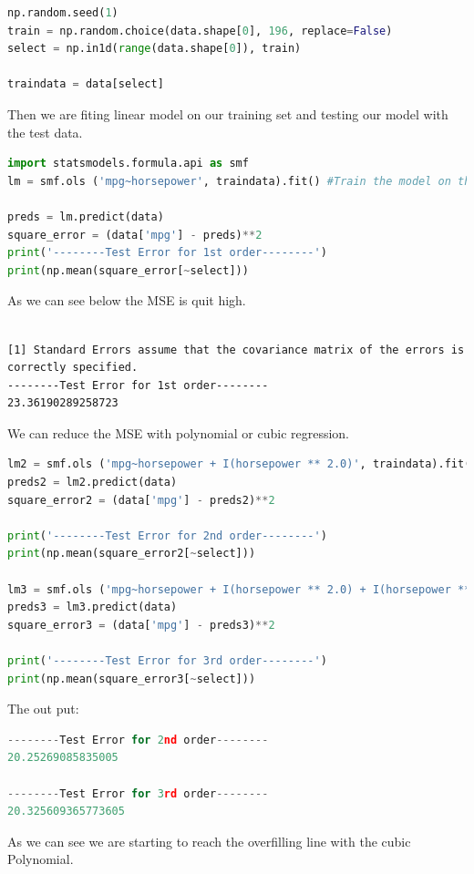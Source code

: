 \begin{lstlisting}[language=Python]
np.random.seed(1)
train = np.random.choice(data.shape[0], 196, replace=False)
select = np.in1d(range(data.shape[0]), train)

traindata = data[select]
\end{lstlisting}

Then we are fiting linear model on our  training set and testing our model with the test data.

\begin{lstlisting}[language=Python]
import statsmodels.formula.api as smf
lm = smf.ols ('mpg~horsepower', traindata).fit() #Train the model on the traindata.

preds = lm.predict(data)
square_error = (data['mpg'] - preds)**2
print('--------Test Error for 1st order--------')
print(np.mean(square_error[~select]))
\end{lstlisting}
As we can see below the MSE is quit high.
\begin{lstlisting}

[1] Standard Errors assume that the covariance matrix of the errors is correctly specified.
--------Test Error for 1st order--------
23.36190289258723
\end{lstlisting}
We can reduce the MSE with polynomial or cubic regression.
\begin{lstlisting}[language=Python]
lm2 = smf.ols ('mpg~horsepower + I(horsepower ** 2.0)', traindata).fit()
preds2 = lm2.predict(data)
square_error2 = (data['mpg'] - preds2)**2

print('--------Test Error for 2nd order--------')
print(np.mean(square_error2[~select]))

lm3 = smf.ols ('mpg~horsepower + I(horsepower ** 2.0) + I(horsepower ** 3.0)', traindata).fit()
preds3 = lm3.predict(data)
square_error3 = (data['mpg'] - preds3)**2

print('--------Test Error for 3rd order--------')
print(np.mean(square_error3[~select]))

\end{lstlisting}
The out put:
\begin{lstlisting}[language=Python]
--------Test Error for 2nd order--------
20.25269085835005

--------Test Error for 3rd order--------
20.325609365773605

\end{lstlisting}
As we can see we are starting to reach the overfilling line with the cubic Polynomial. 
 
